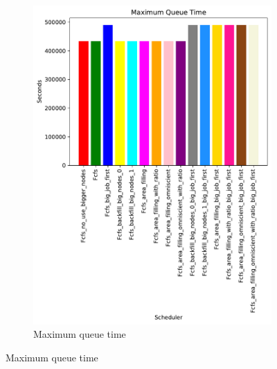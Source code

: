 \documentclass[a4paper]{article}
\begin{document}
\begin{figure}[H]
\begin{subfigure}[b]{0.4\linewidth}\centering\includegraphics[width=1\linewidth]{MBSS/plot/Size_Constraint_2022-01-24->2022-01-24_Maximum_queue_time_450_128_32_256_4_1024.pdf}\caption{Maximum queue time}\label{8}\end{subfigure}

\end{figure}
\end{document}
